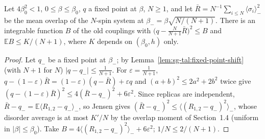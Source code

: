 \begin{lemma}
\label{lem:sg-tal:old-overlap-defect}
  \leanok
{}
Let $4\beta_0^2<1$, $0\le\beta\le\beta_0$, $q$ a fixed point at $\beta$, $N\ge1$, and let $\bar R=N^{-1}\sum_{i\le N}\langle\sigma_i\rangle_-^2$ be the mean overlap of the $N$-spin system at $\beta_-=\beta\sqrt{N/(N+1)}$.  There is an integrable function $B$ of the old couplings with $\bigl(q-\frac N{N+1}\bar R\bigr)^2\le B$ and $\mathbb E B\le K/(N+1)$, where $K$ depends on $(\beta_0,h)$ only.
\end{lemma}
\begin{proof}
  \leanok
Let $q_-$ be a fixed point at $\beta_-$; by Lemma~\ref{lem:sg-tal:fixed-point-shift} (with $N+1$ for $N$) $|q-q_-|\le\frac1{N+1}$.  For $\varepsilon=\frac1{N+1}$, $q-(1-\varepsilon)\bar R=(1-\varepsilon)(q-\bar R)+\varepsilon q$ and $(a+b)^2\le2a^2+2b^2$ twice give $(q-(1-\varepsilon)\bar R)^2\le4(\bar R-q_-)^2+6\varepsilon^2$.  Since replicas are independent, $\bar R-q_-=\mathbb E\langle R_{1,2}-q_-\rangle_-$, so Jensen gives $(\bar R-q_-)^2\le\langle(R_{1,2}-q_-)^2\rangle_-$, whose disorder average is at most $K'/N$ by the overlap moment of Section~1.4 (uniform in $|\beta|\le\beta_0$).  Take $B=4\langle(R_{1,2}-q_-)^2\rangle_-+6\varepsilon^2$; $1/N\le2/(N+1)$.
\end{proof}

